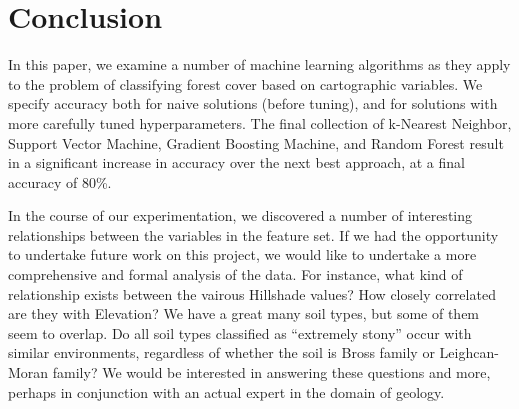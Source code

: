 \section{Conclusion}
\label{sec:-conc}

In this paper, we examine a number of machine learning algorithms as 
they apply to the problem of classifying forest cover based on 
cartographic variables.  We specify accuracy both for naive solutions 
(before tuning), and for solutions with more carefully tuned 
hyperparameters.  The final collection of k-Nearest Neighbor, Support 
Vector Machine, Gradient Boosting Machine, and Random Forest result in 
a significant increase in accuracy over the next best approach, at a 
final accuracy of 80\%.

In the course of our experimentation, we discovered a number of 
interesting relationships between the variables in the feature set.  
If we had the opportunity to undertake future work on this project, we 
would like to undertake a more comprehensive and formal analysis of the 
data.  For instance, what kind of relationship exists between the 
vairous Hillshade values?  How closely correlated are they with 
Elevation?  We have a great many soil types, but some of them seem to 
overlap. Do all soil types classified as ``extremely stony'' occur with 
similar environments, regardless of whether the soil is Bross family or 
Leighcan-Moran family?  We would be interested in answering these 
questions and more, perhaps in conjunction with an actual expert in 
the domain of geology.






